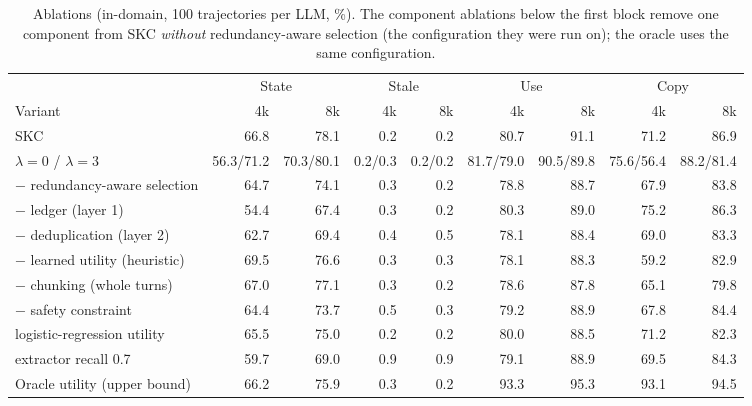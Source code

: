 \begin{table}[t]
\centering
\small
\caption{Ablations (in-domain, 100 trajectories per LLM, \%). The component
ablations below the first block remove one component from SKC \emph{without}
redundancy-aware selection (the configuration they were run on); the oracle uses
the same configuration.}
\label{tab:ablation}
\setlength{\tabcolsep}{3pt}
\begin{tabular}{l rr rr rr rr}
\toprule
 & \multicolumn{2}{c}{State} & \multicolumn{2}{c}{Stale} & \multicolumn{2}{c}{Use} & \multicolumn{2}{c}{Copy} \\
\cmidrule(lr){2-3}\cmidrule(lr){4-5}\cmidrule(lr){6-7}\cmidrule(lr){8-9}
Variant & 4k & 8k & 4k & 8k & 4k & 8k & 4k & 8k \\
\midrule
SKC & 66.8 & 78.1 & 0.2 & 0.2 & 80.7 & 91.1 & 71.2 & 86.9 \\
\quad $\lambda=0$ / $\lambda=3$ & 56.3/71.2 & 70.3/80.1 & 0.2/0.3 & 0.2/0.2 & 81.7/79.0 & 90.5/89.8 & 75.6/56.4 & 88.2/81.4 \\
\quad $-$ redundancy-aware selection & 64.7 & 74.1 & 0.3 & 0.2 & 78.8 & 88.7 & 67.9 & 83.8 \\
\midrule
\quad\quad $-$ ledger (layer 1) & 54.4 & 67.4 & 0.3 & 0.2 & 80.3 & 89.0 & 75.2 & 86.3 \\
\quad\quad $-$ deduplication (layer 2) & 62.7 & 69.4 & 0.4 & 0.5 & 78.1 & 88.4 & 69.0 & 83.3 \\
\quad\quad $-$ learned utility (heuristic) & 69.5 & 76.6 & 0.3 & 0.3 & 78.1 & 88.3 & 59.2 & 82.9 \\
\quad\quad $-$ chunking (whole turns) & 67.0 & 77.1 & 0.3 & 0.2 & 78.6 & 87.8 & 65.1 & 79.8 \\
\quad\quad $-$ safety constraint & 64.4 & 73.7 & 0.5 & 0.3 & 79.2 & 88.9 & 67.8 & 84.4 \\
\quad\quad logistic-regression utility & 65.5 & 75.0 & 0.2 & 0.2 & 80.0 & 88.5 & 71.2 & 82.3 \\
\quad\quad extractor recall 0.7 & 59.7 & 69.0 & 0.9 & 0.9 & 79.1 & 88.9 & 69.5 & 84.3 \\
\midrule
Oracle utility (upper bound) & 66.2 & 75.9 & 0.3 & 0.2 & 93.3 & 95.3 & 93.1 & 94.5 \\
\bottomrule
\end{tabular}
\end{table}

